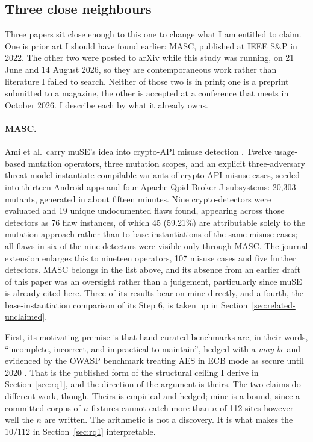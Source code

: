 \documentclass[11pt]{article}
\begin{document}
\subsection{Three close neighbours}
\label{sec:related-neighbours}

Three papers sit close enough to this one to change what I am entitled to claim. One is
prior art I should have found earlier: MASC, published at IEEE S\&P in 2022. The other two
were posted to arXiv while this study was running, on 21 June and 14 August 2026, so they
are contemporaneous work rather than literature I failed to search. Neither of those two is
in print; one is a preprint submitted to a magazine, the other is accepted at a conference
that meets in October 2026. I describe each by what it already owns.

\paragraph{MASC.} Ami et al.\ carry muSE's idea into crypto-API misuse detection
\citep{ami2022masc,ami2023masc}. Twelve usage-based mutation operators, three mutation
scopes, and an explicit three-adversary threat model instantiate compilable variants of
crypto-API misuse cases, seeded into thirteen Android apps and four Apache Qpid Broker-J
subsystems: 20,303 mutants, generated in about fifteen minutes. Nine crypto-detectors were
evaluated and 19 unique undocumented flaws found, appearing across those detectors as 76
flaw instances, of which 45 (59.21\%) are attributable solely to the mutation approach
rather than to base instantiations of the same misuse cases; all flaws in six of the nine
detectors were visible only through MASC. The journal extension enlarges this to nineteen
operators, 107 misuse cases and five further detectors. MASC belongs in the list above, and
its absence from an earlier draft of this paper was an oversight rather than a judgement,
particularly since muSE is already cited here. Three of its results bear on mine directly,
and a fourth, the base-instantiation comparison of its Step 6, is taken up in
Section~\ref{sec:related-unclaimed}.

First, its motivating premise is that hand-curated benchmarks are, in their words,
``incomplete, incorrect, and impractical to maintain'', hedged with a \emph{may be} and
evidenced by the OWASP benchmark treating AES in ECB mode as secure until 2020
\citep{ami2022masc}. That is the published form of the structural ceiling I derive in
Section~\ref{sec:rq1}, and the direction of the argument is theirs. The two claims do
different work, though. Theirs is empirical and hedged; mine is a bound, since a committed
corpus of $n$ fixtures cannot catch more than $n$ of 112 sites however well the $n$ are
written. The arithmetic is not a discovery. It is what makes the $10/112$ in
Section~\ref{sec:rq1} interpretable.
\end{document}
